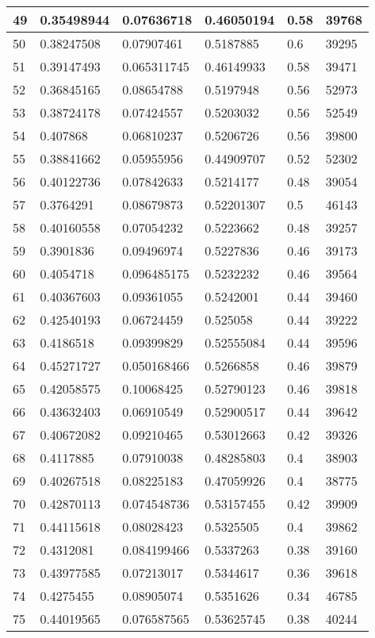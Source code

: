 \begin{longtable}{|l|l|l|l|l|l|}
49 & 0.35498944 & 0.07636718 & 0.46050194 & 0.58 & 39768 \\ \hline 
50 & 0.38247508 & 0.07907461 & 0.5187885 & 0.6 & 39295 \\ \hline 
51 & 0.39147493 & 0.065311745 & 0.46149933 & 0.58 & 39471 \\ \hline 
52 & 0.36845165 & 0.08654788 & 0.5197948 & 0.56 & 52973 \\ \hline 
53 & 0.38724178 & 0.07424557 & 0.5203032 & 0.56 & 52549 \\ \hline 
54 & 0.407868 & 0.06810237 & 0.5206726 & 0.56 & 39800 \\ \hline 
55 & 0.38841662 & 0.05955956 & 0.44909707 & 0.52 & 52302 \\ \hline 
56 & 0.40122736 & 0.07842633 & 0.5214177 & 0.48 & 39054 \\ \hline 
57 & 0.3764291 & 0.08679873 & 0.52201307 & 0.5 & 46143 \\ \hline 
58 & 0.40160558 & 0.07054232 & 0.5223662 & 0.48 & 39257 \\ \hline 
59 & 0.3901836 & 0.09496974 & 0.5227836 & 0.46 & 39173 \\ \hline 
60 & 0.4054718 & 0.096485175 & 0.5232232 & 0.46 & 39564 \\ \hline 
61 & 0.40367603 & 0.09361055 & 0.5242001 & 0.44 & 39460 \\ \hline 
62 & 0.42540193 & 0.06724459 & 0.525058 & 0.44 & 39222 \\ \hline 
63 & 0.4186518 & 0.09399829 & 0.52555084 & 0.44 & 39596 \\ \hline 
64 & 0.45271727 & 0.050168466 & 0.5266858 & 0.46 & 39879 \\ \hline 
65 & 0.42058575 & 0.10068425 & 0.52790123 & 0.46 & 39818 \\ \hline 
66 & 0.43632403 & 0.06910549 & 0.52900517 & 0.44 & 39642 \\ \hline 
67 & 0.40672082 & 0.09210465 & 0.53012663 & 0.42 & 39326 \\ \hline 
68 & 0.4117885 & 0.07910038 & 0.48285803 & 0.4 & 38903 \\ \hline 
69 & 0.40267518 & 0.08225183 & 0.47059926 & 0.4 & 38775 \\ \hline 
70 & 0.42870113 & 0.074548736 & 0.53157455 & 0.42 & 39909 \\ \hline 
71 & 0.44115618 & 0.08028423 & 0.5325505 & 0.4 & 39862 \\ \hline 
72 & 0.4312081 & 0.084199466 & 0.5337263 & 0.38 & 39160 \\ \hline 
73 & 0.43977585 & 0.07213017 & 0.5344617 & 0.36 & 39618 \\ \hline 
74 & 0.4275455 & 0.08905074 & 0.5351626 & 0.34 & 46785 \\ \hline 
75 & 0.44019565 & 0.076587565 & 0.53625745 & 0.38 & 40244 \\ \hline 
\end{longtable}